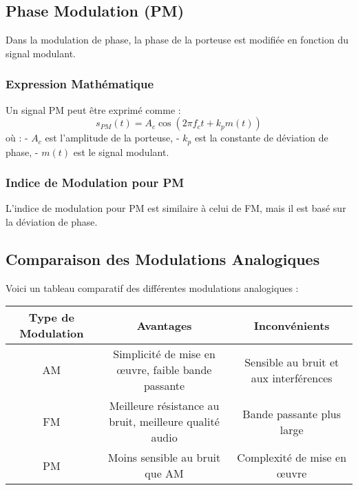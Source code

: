\documentclass[10pt,a4paper]{article}
\begin{document}

\subsection*{Phase Modulation (PM)}
Dans la modulation de phase, la phase de la porteuse est modifiée en fonction du signal modulant.

\subsubsection*{Expression Mathématique}
Un signal PM peut être exprimé comme :
\[ s_{PM}(t) = A_c \cos \left(2\pi f_c t + k_p m(t) \right) \]
où :
- \( A_c \) est l'amplitude de la porteuse,
- \( k_p \) est la constante de déviation de phase,
- \( m(t) \) est le signal modulant.

\subsubsection*{Indice de Modulation pour PM}
L'indice de modulation pour PM est similaire à celui de FM, mais il est basé sur la déviation de phase.

\subsection*{Comparaison des Modulations Analogiques}
Voici un tableau comparatif des différentes modulations analogiques :

\begin{tabular}{|c|c|c|}
\hline
Type de Modulation & Avantages & Inconvénients \\
\hline
AM & Simplicité de mise en œuvre, faible bande passante & Sensible au bruit et aux interférences \\
\hline
FM & Meilleure résistance au bruit, meilleure qualité audio & Bande passante plus large \\
\hline
PM & Moins sensible au bruit que AM & Complexité de mise en œuvre \\
\hline
\end{tabular}
\end{document}
